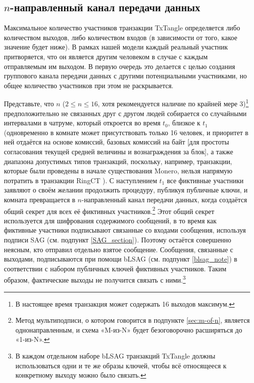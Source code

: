 \subsection{$n$-направленный канал передачи данных}
\label{subsec:n-way-channel}

Максимальное количество участников транзакции TxTangle определяется либо количеством выходов, либо количеством входов (в зависимости от того, какое значение будет ниже). В рамках нашей модели каждый реальный участник притворяется, что он является другим человеком в случае с каждым отправляемым им выходом. В первую очередь это делается с целью создания группового канала передачи данных с другими потенциальными участниками, но общее количество участников при этом не раскрывается.

Представьте, что $n$ ($2 \leq n \leq 16$, хотя рекомендуется наличие по крайней мере 3)\footnote{В настоящее время транзакция может содержать 16 выходов максимум.} предположи\-тельно не связанных друг с другом людей собирается со случайными интервалами в чатруме, который откроется во время $t_0$, близкое к $t_1$ (одновременно в комнате может присутствовать только 16 человек, и приоритет в ней отдаётся на основе комиссий, базовых комиссий на байт [для простоты согласования текущей средней величины и вознаграждения за блок], а также диапазона допустимых типов транзакций, поскольку, например, транзакции, которые были проведены в начале существования Monero, нельзя напрямую потратить в транзакции RingCT \cite{pre-ringct-outputs-like-coinbase-research-issue-59}). С наступлением $t_1$ все фиктивные участники заявляют о своём желании продолжить процедуру, публикуя публичные ключи, и комната превращается в $n$-направленный канал передачи данных, когда создаётся общий секрет для всех её фиктивных участников.\footnote{Метод мультиподписи, о котором говорится в подпункте \ref{sec:m-of-n}, является однонаправленным, и схема «M-из-N» будет безоговорочно расширяться до «1-из-N».} Этот общий секрет используется для шифрования содержимого сообщений, в то время как фиктив\-ные участники подписывают связанные со входами сообщения, используя подписи SAG (см. подпункт \ref{SAG_section}). Поэтому остаётся совершенно неясным, кто отправил отдельно взятое сообще\-ние. Сообщения, связанные с выходами, подписываются при помощи bLSAG (см. подпункт \ref{blsag_note}) в соответствии с набором публичных ключей фиктивных участников. Таким образом, фактические выходы не получится связать с ними.\footnote{В каждом отдельном наборе bLSAG транзакций TxTangle должны использоваться одни и те же образы ключей, чтобы всё относящееся к конкретному выходу можно было связать.}%


